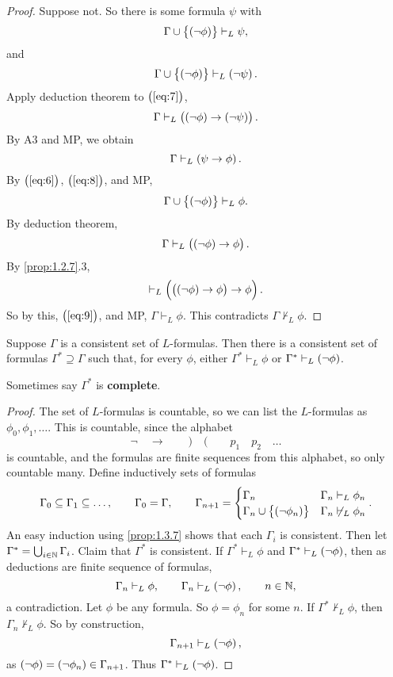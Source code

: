 \begin{proof}
Suppose not. So there is some formula $ \psi $ with
\begin{equation}
\label{eq:6}
\Gamma \cup \cbr{\notb{\phi}} \vdash_L \psi,
\end{equation}
and
\begin{equation}
\label{eq:7}
\Gamma \cup \cbr{\notb{\phi}} \vdash_L \notb{\psi}.
\end{equation}
Apply deduction theorem to $ \br{\ref{eq:7}} $,
$$ \Gamma \vdash_L \impb{\notb{\phi}}{\notb{\psi}}. $$
By A3 and MP, we obtain
\begin{equation}
\label{eq:8}
\Gamma \vdash_L \impb{\psi}{\phi}.
\end{equation}
By $ \br{\ref{eq:6}} $, $ \br{\ref{eq:8}} $, and MP,
$$ \Gamma \cup \cbr{\notb{\phi}} \vdash_L \phi. $$
By deduction theorem,
\begin{equation}
\label{eq:9}
\Gamma \vdash_L \impb{\notb{\phi}}{\phi}.
\end{equation}
By \ref{prop:1.2.7}.$ 3 $,
$$ \vdash_L \impb{\impb{\notb{\phi}}{\phi}}{\phi}. $$
So by this, $ \br{\ref{eq:9}} $, and MP, $ \Gamma \vdash_L \phi $. This contradicts $ \Gamma \not\vdash_L \phi $.
\end{proof}

\begin{proposition}
\label{prop:1.3.8}
Suppose $ \Gamma $ is a consistent set of $ L $-formulas. Then there is a consistent set of formulas $ \Gamma^* \supseteq \Gamma $ such that, for every $ \phi $, either $ \Gamma^* \vdash_L \phi $ or $ \Gamma^* \vdash_L \notb{\phi} $.
\end{proposition}

Sometimes say $ \Gamma^* $ is \textbf{complete}.

\begin{proof}
The set of $ L $-formulas is countable, so we can list the $ L $-formulas as $ \phi_0, \phi_1, \dots $. This is countable, since the alphabet
$$ \neg \quad \rightarrow \qquad ) \quad ( \qquad p_1 \quad p_2 \quad \dots $$
is countable, and the formulas are finite sequences from this alphabet, so only countable many. Define inductively sets of formulas
$$ \Gamma_0 \subseteq \Gamma_1 \subseteq \dots, \qquad \Gamma_0 = \Gamma, \qquad \Gamma_{n + 1} =
\begin{cases}
\Gamma_n & \Gamma_n \vdash_L \phi_n \\
\Gamma_n \cup \cbr{\notb{\phi_n}} & \Gamma_n \not\vdash_L \phi_n
\end{cases}.
$$
An easy induction using \ref{prop:1.3.7} shows that each $ \Gamma_i $ is consistent. Then let $ \Gamma^* = \bigcup_{i \in \mathbb{N}} \Gamma_i $. Claim that $ \Gamma^* $ is consistent. If $ \Gamma^* \vdash_L \phi $ and $ \Gamma^* \vdash_L \notb{\phi} $, then as deductions are finite sequence of formulas,
$$ \Gamma_n \vdash_L \phi, \qquad \Gamma_n \vdash_L \notb{\phi}, \qquad n \in \N, $$
a contradiction. Let $ \phi $ be any formula. So $ \phi = \phi_n $ for some $ n $. If $ \Gamma^* \not\vdash_L \phi $, then $ \Gamma_n \not\vdash_L \phi $. So by construction,
$$ \Gamma_{n + 1} \vdash_L \notb{\phi}, $$
as $ \notb{\phi} = \notb{\phi_n} \in \Gamma_{n + 1} $. Thus $ \Gamma^* \vdash_L \notb{\phi} $.
\end{proof}

